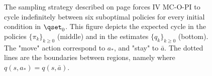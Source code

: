 \begin{figure}[htbp]




            
    \caption{The sampling strategy described on page \pageref{pg: sampling strat 3 states} forces IV MC-O-PI to cycle indefinitely between six suboptimal policies
    for every initial condition in $\qset_0$.
    This figure depicts the expected cycle in the policies $\{\pi_k\}_{k\ge 0}$ (middle) and in the estimates $\{q_k\}_{k\ge 0}$ (bottom).
    The "move" action correspond to $a_*$, and "stay" to $\bar a$.
    The dotted lines are the boundaries between regions, namely where $q(s,a_*) = q(s,\bar a)$.}
    \label{fig: explain loop on-policy bias MDP}
    \end{figure}%
